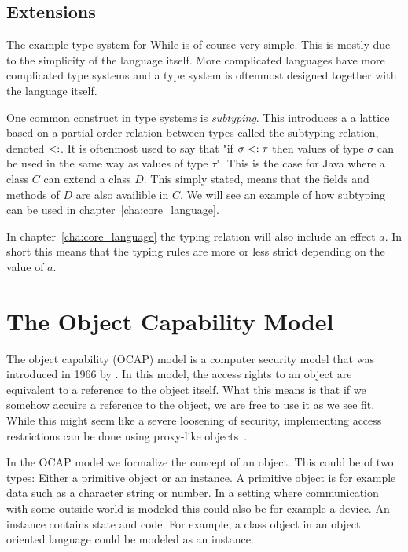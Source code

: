 \subsection{Extensions}
\label{sub:extensions}

The example type system for While is of course very simple. This is mostly due
to the simplicity of the language itself. More complicated languages have more
complicated type systems and a type system is oftenmost designed together 
with the language itself. 

One common construct in type systems is \emph{subtyping}. This introduces a a
lattice based on a partial order relation between types called the subtyping
relation, denoted $<:$.  It is oftenmost used to say that "if $\sigma <:
\tau$ then values of type $\sigma$ can be used in the same way as values of type
$\tau$". This is the case for Java where a class $C$ can extend a class $D$.
This simply stated, means that the fields and methods of $D$ are also availible
in $C$. We will see an example of how subtyping can be used in
chapter~\ref{cha:core_language}. 

In chapter~\ref{cha:core_language} the typing relation will also include an
effect $a$. In short this means that the typing rules are more or less strict
depending on the value of $a$.

\section{The Object Capability Model}%
\label{sec:the_object_capability_model}

The object capability (OCAP) model is a computer security model that was
introduced in 1966 by \textcite{Dennis-VanHorn66}. In this model, the access
rights to an object are equivalent to a reference to the object itself. What
this means is that if we somehow accuire a reference to the object, we are free
to use it as we see fit. While this might seem like a severe loosening of
security, implementing access restrictions can be done using proxy-like
objects~\parencite{Miller06b}.

In the OCAP model we formalize the concept of an object. This could be of
two types: Either a primitive object or an instance. A primitive object is
for example data such as a character string or number. In a setting where
communication with some outside world is modeled this could also be for example
a device. An instance contains state and code. For example, a class
object in an object oriented language could be modeled as an
instance.

